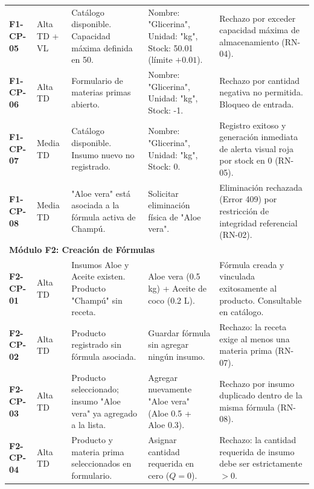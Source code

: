 \documentclass[11pt,a4paper]{article}
\begin{document}
\begin{longtable}{p{1.4cm} p{1.6cm} p{4.2cm} p{3.2cm} p{4.6cm}}
\textbf{F1-CP-05} & Alta \newline TD + VL & Catálogo disponible. Capacidad máxima definida en 50. & Nombre: "Glicerina", Unidad: "kg", Stock: 50.01 (límite $+ 0.01$). & Rechazo por exceder capacidad máxima de almacenamiento (RN-04). \\
\textbf{F1-CP-06} & Alta \newline TD & Formulario de materias primas abierto. & Nombre: "Glicerina", Unidad: "kg", Stock: -1. & Rechazo por cantidad negativa no permitida. Bloqueo de entrada. \\
\textbf{F1-CP-07} & Media \newline TD & Catálogo disponible. Insumo nuevo no registrado. & Nombre: "Glicerina", Unidad: "kg", Stock: 0. & Registro exitoso y generación inmediata de alerta visual roja por stock en 0 (RN-05). \\
\textbf{F1-CP-08} & Media \newline TD & "Aloe vera" está asociada a la fórmula activa de Champú. & Solicitar eliminación física de "Aloe vera". & Eliminación rechazada (Error 409) por restricción de integridad referencial (RN-02). \\
\midrule
\multicolumn{5}{l}{\textbf{\color{primary}Módulo F2: Creación de Fórmulas}} \\
\midrule
\textbf{F2-CP-01} & Alta \newline TD & Insumos Aloe y Aceite existen. Producto "Champú" sin receta. & Aloe vera (0.5 kg) + Aceite de coco (0.2 L). & Fórmula creada y vinculada exitosamente al producto. Consultable en catálogo. \\
\textbf{F2-CP-02} & Alta \newline TD & Producto registrado sin fórmula asociada. & Guardar fórmula sin agregar ningún insumo. & Rechazo: la receta exige al menos una materia prima (RN-07). \\
\textbf{F2-CP-03} & Alta \newline TD & Producto seleccionado; insumo "Aloe vera" ya agregado a la lista. & Agregar nuevamente "Aloe vera" (Aloe 0.5 + Aloe 0.3). & Rechazo por insumo duplicado dentro de la misma fórmula (RN-08). \\
\textbf{F2-CP-04} & Alta \newline TD & Producto y materia prima seleccionados en formulario. & Asignar cantidad requerida en cero ($Q{=}0$). & Rechazo: la cantidad requerida de insumo debe ser estrictamente $>0$. \\
\end{longtable}
\end{document}
